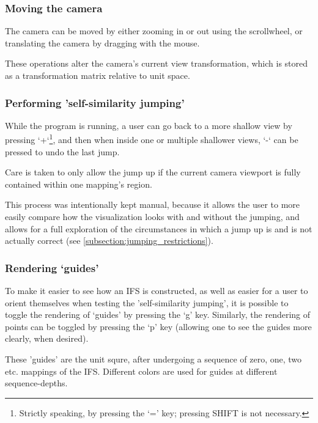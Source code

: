 \documentclass[11pt]{article}
\begin{document}
\subsubsection{Moving the camera}
\label{sec:org03f73d9}
The camera can be moved by either zooming in or out using the scrollwheel,
or translating the camera by dragging with the mouse.

These operations alter the camera's current view transformation, 
which is stored as a transformation matrix relative to unit space.

\subsubsection{Performing 'self-similarity jumping'}
\label{sec:orgc156aa8}

While the program is running, a user can go back to a more shallow view by pressing `+`\footnote{Strictly speaking, by pressing the `=' key; pressing SHIFT is not necessary.}, and then when inside one or multiple shallower views,
`-` can be pressed to undo the last jump.

Care is taken to only allow the jump up if the current camera viewport is fully contained within one mapping's region.

This process was intentionally kept manual, because it allows the user to more easily compare how
the visualization looks with and without the jumping, and allows for a full exploration of the circumstances
in which a jump up is and is not actually correct (see \autoref{subsection:jumping_restrictions}).
\subsubsection{Rendering `guides'}
\label{sec:orgc1fad93}

To make it easier to see how an IFS is constructed, as well as easier for a user to orient themselves when
testing the 'self-similarity jumping', it is possible to toggle the rendering of `guides' by pressing the `g' key.
Similarly, the rendering of points can be toggled by pressing the `p' key (allowing one to see the guides more clearly, when desired).

These 'guides' are the unit squre, after undergoing a sequence of zero, one, two etc. mappings of the IFS.
Different colors are used for guides at different sequence-depths.
\end{document}

